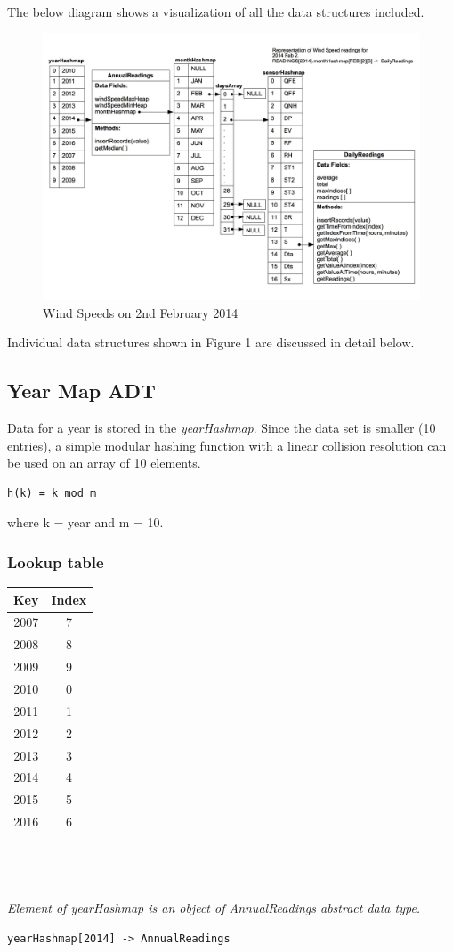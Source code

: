 \documentclass[12pt]{article}
\begin{document}
\paragraph{}The below diagram shows a visualization of all the data structures included.
\begin{figure}[H]
	\includegraphics[width=\linewidth]{./data_structure_layout_heap.jpg}
	\caption{Wind Speeds on 2nd February 2014}
	\label{example_datastructure_layout}
\end{figure}
Individual data structures shown in Figure 1 are discussed in detail below.
\subsection{Year Map ADT}
Data for a year is stored in the {\em yearHashmap}. Since the data set is smaller (10 entries), a simple modular hashing function with a linear collision resolution can be used on an array of 10 elements.
\begin{lstlisting}
h(k) = k mod m
\end{lstlisting}
where k = year and m = 10.
\subsubsection{Lookup table}
\begin{tabular}{| c | c |}
	\hline
	Key & Index \\
	\hline
	2007 & 7 \\
	\hline
	2008  & 8 \\
	\hline
	2009 & 9 \\
	\hline
	2010 & 0 \\
	\hline
	2011 & 1 \\
	\hline
	2012 & 2 \\
	\hline
	2013 & 3 \\
	\hline
	2014 & 4 \\
	\hline
	2015 & 5 \\
	\hline
	2016 & 6 \\
	\hline
\end{tabular}
\\ \\ \\
{\em Element of yearHashmap is an object of AnnualReadings abstract data type.}
\begin{lstlisting}
yearHashmap[2014] -> AnnualReadings
\end{lstlisting}
\end{document}
